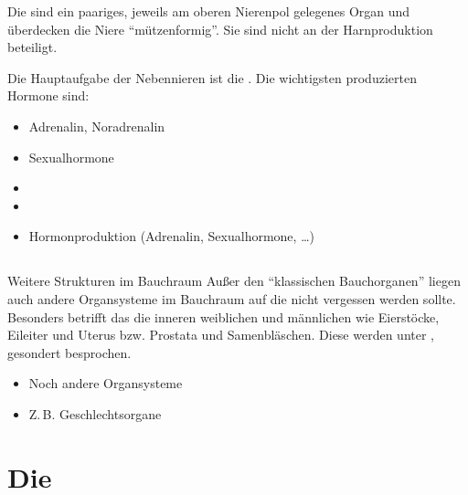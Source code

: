 \TextSlide{\TxBeschreibung}
{%
Die   sind ein paariges, 
jeweils am oberen Nierenpol
gelegenes Organ und überdecken die Niere \enquote{mützenformig}.
Sie sind nicht an der Harnproduktion beteiligt. 

Die Hauptaufgabe der Nebennieren ist die
.  Die wichtigsten
produzierten Hormone sind:

\begin{itemize}
    \item Adrenalin, Noradrenalin
    \item Sexualhormone 
    \item {}
    \item {}
\end{itemize}

}{%
\begin{itemize}
  \item Hormonproduktion (Adrenalin, Sexualhormone, \ldots)
\end{itemize}
}{}{}{}




\subsection{}

\TextSlide
{Weitere Strukturen im Bauchraum}%
{%
Außer den \protect\enquote{klassischen Bauchorganen} liegen auch andere
Organsysteme im Bauchraum auf die nicht vergessen werden
sollte. 
%
Besonders betrifft das die inneren weiblichen und männlichen
 wie Eierstöcke, Eileiter und Uterus
bzw. Prostata und Samenbläschen. 
%
Diese werden unter 
, 
gesondert besprochen.}%
{
\begin{itemize}
  \item Noch andere Organsysteme
  \item Z.\,B. Geschlechtsorgane
\end{itemize}
}%



\clearpage
\section{Die }
\label{topic:geschlechtsorgane}

